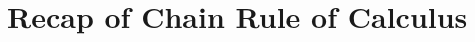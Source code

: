 \section{Recap of Chain Rule of Calculus}
\label{sec:mlp_backprop:recap_of_chain_rule_of_calculus}

